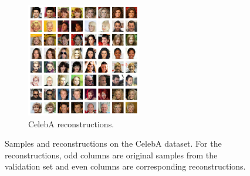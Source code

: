 \documentclass{article}
\newcommand{\figureHeight}{5cm}
\begin{document}
\begin{figure}[p]
\begin{subfigure}[t]{0.49\textwidth}
        \includegraphics[height=\figureHeight]{celeba_reconstructions.png}
        \caption{\label{fig:celeba_reconstructions} CelebA reconstructions.}
    \end{subfigure}
    \caption{\label{fig:celeba_images} Samples and reconstructions on the CelebA
        dataset. For the reconstructions, odd columns are
        original samples from the validation set and even columns are
        corresponding reconstructions.}
\end{figure}
\end{document}
